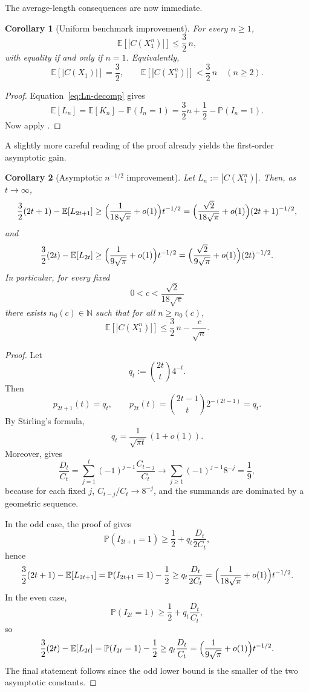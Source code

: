 \documentclass[10pt,a4paper]{article}
\newtheorem{corollary}{Corollary}
\theoremstyle{definition}
\theoremstyle{remark}
\newcommand{\1}{\mathbf{1}}
\newcommand{\PP}{\mathbb{P}}
\newcommand{\EE}{\mathbb{E}}
\begin{document}
The average-length consequences are now immediate.

\begin{corollary}[Uniform benchmark improvement]\label{cor:uniform}
For every $n\ge1$,
\[
\EE[|C(X_1^n)|]\le \frac32\,n,
\]
with equality if and only if $n=1$. Equivalently,
\[
\EE[|C(X_1)|]=\frac32,
\qquad
\EE[|C(X_1^n)|]<\frac32\,n\quad (n\ge2).
\]
\end{corollary}

\begin{proof}
Equation~\eqref{eq:Ln-decomp} gives
\[
\EE[L_n]=\EE[K_n]-\PP(I_n=1)=\frac32 n+\frac12-\PP(I_n=1).
\]
Now apply .
\end{proof}

A slightly more careful reading of the proof already yields the first-order asymptotic gain.

\begin{corollary}[Asymptotic $n^{-1/2}$ improvement]\label{cor:asymp}
Let $L_n:=|C(X_1^n)|$. Then, as $t\to\infty$,
\[
\frac32(2t+1)-\EE[L_{2t+1}]
\ge
\Bigl(\frac{1}{18\sqrt\pi}+o(1)\Bigr)t^{-1/2}
=
\Bigl(\frac{\sqrt2}{18\sqrt\pi}+o(1)\Bigr)(2t+1)^{-1/2},
\]
and
\[
\frac32(2t)-\EE[L_{2t}]
\ge
\Bigl(\frac{1}{9\sqrt\pi}+o(1)\Bigr)t^{-1/2}
=
\Bigl(\frac{\sqrt2}{9\sqrt\pi}+o(1)\Bigr)(2t)^{-1/2}.
\]
In particular, for every fixed
\[
0<c<\frac{\sqrt2}{18\sqrt\pi}
\]
there exists $n_0(c)\in\mathbb N$ such that for all $n\ge n_0(c)$,
\[
\EE[|C(X_1^n)|]\le \frac32\,n-\frac{c}{\sqrt n}.
\]
\end{corollary}

\begin{proof}
Let
\[
q_t:=\binom{2t}{t}4^{-t}.
\]
Then
\[
p_{2t+1}(t)=q_t,
\qquad
p_{2t}(t)=\binom{2t-1}{t}2^{-(2t-1)}=q_t.
\]
By Stirling's formula,
\[
q_t=\frac{1}{\sqrt{\pi t}}\,(1+o(1)).
\]
Moreover,  gives
\[
\frac{D_t}{C_t}
=\sum_{j=1}^{t}(-1)^{j-1}\frac{C_{t-j}}{C_t}
\longrightarrow
\sum_{j\ge1}(-1)^{j-1}8^{-j}
=\frac19,
\]
because for each fixed $j$, $C_{t-j}/C_t\to 8^{-j}$, and the summands are dominated by a geometric sequence.

In the odd case, the proof of  gives
\[
\PP(I_{2t+1}=1)\ge \frac12+q_t\frac{D_t}{2C_t},
\]
hence
\[
\frac32(2t+1)-\EE[L_{2t+1}]
=\PP(I_{2t+1}=1)-\frac12
\ge q_t\frac{D_t}{2C_t}
=\Bigl(\frac{1}{18\sqrt\pi}+o(1)\Bigr)t^{-1/2}.
\]
In the even case,
\[
\PP(I_{2t}=1)\ge \frac12+q_t\frac{D_t}{C_t},
\]
so
\[
\frac32(2t)-\EE[L_{2t}]
=\PP(I_{2t}=1)-\frac12
\ge q_t\frac{D_t}{C_t}
=\Bigl(\frac{1}{9\sqrt\pi}+o(1)\Bigr)t^{-1/2}.
\]
The final statement follows since the odd lower bound is the smaller of the two asymptotic constants.
\end{proof}
\end{document}
